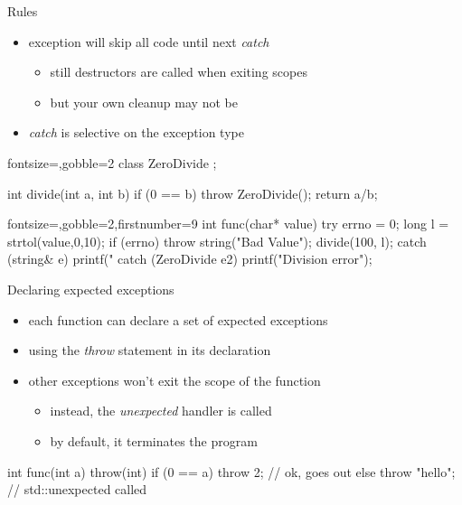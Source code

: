 \begin{frame}[fragile]
  \begin{block}{Rules}
    \begin{itemize}
    \item exception will skip all code until next {\it catch}
    \begin{itemize}
      \item still destructors are called when exiting scopes
      \item but your own cleanup may not be
    \end{itemize}
    \item {\it catch} is selective on the exception type
    \end{itemize}
  \end{block}
  \begin{multicols}{2}
    \begin{cppcode*}{fontsize=\scriptsize,gobble=2}
      class ZeroDivide {};
      
      int divide(int a, int b) {
        if (0 == b) {
          throw ZeroDivide();
        }
        return a/b;
      }
    \end{cppcode*}
    \columnbreak
    \begin{cppcode*}{fontsize=\scriptsize,gobble=2,firstnumber=9} 
      int func(char* value) {
        try {
          errno = 0;
          long l = strtol(value,0,10);
          if (errno) {
            throw string("Bad Value");
          }
          divide(100, l);
        } catch (string& e) {
          printf("%
        } catch (ZeroDivide e2) {
          printf("Division error\n");
        }
      }
    \end{cppcode*}
  \end{multicols}
\end{frame}

\begin{frame}[fragile]
  \begin{block}{Declaring expected exceptions}
    \begin{itemize}
    \item each function can declare a set of expected exceptions
    \item using the {\it throw} statement in its declaration
    \item other exceptions won't exit the scope of the function
      \begin{itemize}
      \item instead, the {\it unexpected} handler is called
      \item by default, it terminates the program
      \end{itemize}
    \end{itemize}
  \end{block}
  \pause
  \begin{cppcode}
    int func(int a) throw(int) {
      if (0 == a) {
        throw 2;  // ok, goes out
      } else {
        throw "hello"; // std::unexpected called
      }
    }
  \end{cppcode}
\end{frame}  

